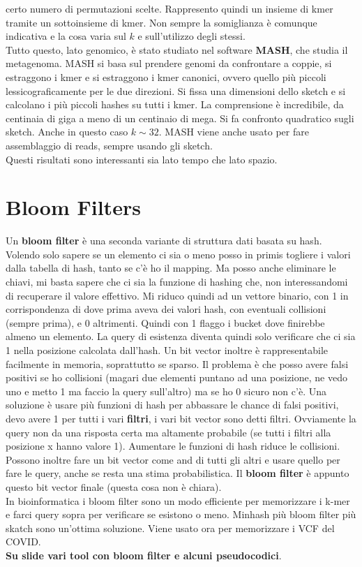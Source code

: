\documentclass[a4paper,12pt, oneside]{book}
\begin{document}
certo numero di permutazioni scelte. Rappresento quindi un insieme di kmer
tramite un sottoinsieme di kmer. Non sempre la somiglianza è comunque indicativa
e la cosa varia sul $k$ e sull'utilizzo degli stessi.\\
Tutto questo, lato genomico, è stato studiato nel software \textbf{MASH}, che
studia il metagenoma. MASH si basa sul prendere genomi da confrontare a coppie,
si estraggono i kmer e si estraggono i kmer canonici, ovvero quello più piccoli
lessicograficamente per le due direzioni. Si fissa una dimensioni dello sketch e
si calcolano i più piccoli hashes su tutti i kmer. La comprensione è
incredibile, da centinaia di giga a meno di un centinaio di mega. Si fa
confronto quadratico sugli sketch. Anche in questo caso $k\sim 32$. MASH viene
anche usato per fare assemblaggio di reads, sempre usando gli sketch. \\
Questi risultati sono interessanti sia lato tempo che lato spazio.

\chapter{Bloom Filters}
Un \textbf{bloom filter} è una seconda variante di struttura dati basata su
hash. Volendo solo sapere se un elemento ci sia o meno posso in primis togliere
i valori dalla tabella di hash, tanto se c'è ho il mapping. Ma posso anche
eliminare le chiavi, mi basta sapere che ci sia la funzione di hashing che, non
interessandomi di recuperare il valore effettivo. Mi riduco quindi ad un vettore
binario, con 1 in corrispondenza di dove prima aveva dei valori hash, con
eventuali collisioni (sempre prima), e 0 altrimenti. Quindi con 1 flaggo i
bucket dove finirebbe almeno un elemento. La query di esistenza diventa quindi
solo verificare che ci sia 1 nella posizione calcolata dall'hash. Un bit vector
inoltre è rappresentabile facilmente in memoria, soprattutto se sparso. Il
problema è che posso avere falsi positivi se ho collisioni (magari due elementi
puntano ad una posizione, ne vedo uno e metto 1 ma faccio la query sull'altro)
ma se ho 0 sicuro non c'è. Una soluzione è usare più funzioni di hash per
abbassare le chance di falsi positivi, devo avere 1 per tutti i vari
\textbf{filtri}, i vari bit vector sono detti filtri. Ovviamente la query non da
una risposta certa ma altamente probabile (se tutti i filtri alla posizione x
hanno valore 1). Aumentare le funzioni di hash riduce le collisioni. Possono
inoltre fare un 
bit vector come and di tutti gli altri e usare quello per fare le query, anche
se resta una stima probabilistica.
Il \textbf{bloom filter} è appunto questo bit vector finale (questa cosa non è
chiara).\\ 
In bioinformatica i bloom filter sono un modo efficiente per memorizzare i k-mer
e farci query sopra per verificare se esistono o meno. Minhash più bloom filter
più skatch sono un'ottima soluzione. Viene usato ora per memorizzare i VCF del
COVID.\\
\textbf{Su slide vari tool con bloom filter e alcuni pseudocodici}.
\end{document}
